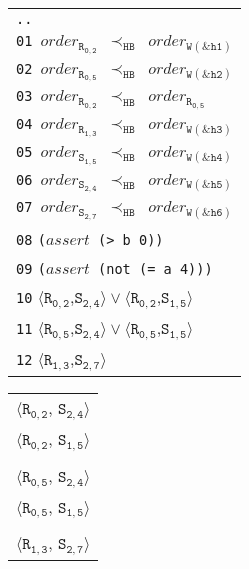 \newsavebox{\boxSMTc}
\begin{lrbox}{\boxSMTc}
\normalsize
\begin{tabular}[t]{l}
\texttt{..} \\
\texttt{01 $\mathit{order_\mathtt{R_{0,2}}}$ $\mathtt{\prec_\mathtt{HB}}$ $\mathit{order_\mathtt{W(\&h1)}}$}\\
\texttt{02 $\mathit{order_\mathtt{R_{0,5}}}$ $\mathtt{\prec_\mathtt{HB}}$ $\mathit{order_\mathtt{W(\&h2)}}$}\\
\texttt{03 $\mathit{order_\mathtt{R_{0,2}}}$ $\mathtt{\prec_\mathtt{HB}}$ $\mathit{order_\mathtt{R_{0,5}}}$}\\
\texttt{04 $\mathit{order_\mathtt{R_{1,3}}}$ $\mathtt{\prec_\mathtt{HB}}$ $\mathit{order_\mathtt{W(\&h3)}}$}\\
\texttt{05 $\mathit{order_\mathtt{S_{1,5}}}$ $\mathtt{\prec_\mathtt{HB}}$ $\mathit{order_\mathtt{W(\&h4)}}$}\\
\texttt{06 $\mathit{order_\mathtt{S_{2,4}}}$ $\mathtt{\prec_\mathtt{HB}}$ $\mathit{order_\mathtt{W(\&h5)}}$}\\
\texttt{07 $\mathit{order_\mathtt{S_{2,7}}}$ $\mathtt{\prec_\mathtt{HB}}$ $\mathit{order_\mathtt{W(\&h6)}}$}\\
\texttt{08} \texttt{($\mathit{assert}$ (> b 0))}\\
\texttt{09} \texttt{($\mathit{assert}$ (not (= a 4)))}\\
\texttt{10} $\langle\mathtt{R_{0,2}}$,$\mathtt{S_{2,4}}\rangle\vee\langle\mathtt{R_{0,2}}$,$\mathtt{S_{1,5}}\rangle$\\
\texttt{11} $\langle\mathtt{R_{0,5}}$,$\mathtt{S_{2,4}}\rangle\vee\langle\mathtt{R_{0,5}}$,$\mathtt{S_{1,5}}\rangle$\\
\texttt{12} $\langle\mathtt{R_{1,3}}$,$\mathtt{S_{2,7}}\rangle$
\end{tabular}
\end{lrbox}

\newsavebox{\boxMP}
\begin{lrbox}{\boxMP}
\normalsize
\begin{tabular}[t]{l}
$\langle\mathtt{R_{0,2}}$, $\mathtt{S_{2,4}}\rangle$\\
$\langle\mathtt{R_{0,2}}$, $\mathtt{S_{1,5}}\rangle$\\
\\
$\langle\mathtt{R_{0,5}}$, $\mathtt{S_{2,4}}\rangle$\\
$\langle\mathtt{R_{0,5}}$, $\mathtt{S_{1,5}}\rangle$\\
\\
$\langle\mathtt{R_{1,3}}$, $\mathtt{S_{2,7}}\rangle$\\
\end{tabular}
\end{lrbox}

